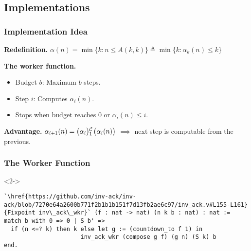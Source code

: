 \subsection{Implementations}
\begin{frame}
\frametitle{Implementation Idea}
\textbf{Redefinition.}
$
\alpha(n) = \min\{k: n\le A(k, k) \} \triangleq \min\{k: \alpha_k(n)\le k \}
$

\bigskip

\textbf{The worker function.}
\bigskip
\begin{itemize}
	\item Budget $b$: Maximum $b$ steps.
	\item Step $i$: Computes $\alpha_i(n)$.
	\item Stops when budget reaches $0$ or $\alpha_i(n) \le i$.
\end{itemize}

\bigskip

\textbf{Advantage.} $\alpha_{i+1}(n) = \cdt{\big(\alpha_i\big)}{1}\big(\alpha_i(n)\big)$ $\implies$ next step is computable from the previous.
\end{frame}


\begin{frame}[fragile]
\frametitle{The Worker Function}


\bigskip

\begin{overlayarea}{\linewidth}{3cm}
\begin{onlyenv}<2->
	\begin{lstlisting}
`\href{https://github.com/inv-ack/inv-ack/blob/7270e64a2600b771f2b1b1b151f7d13fb2ae6c97/inv_ack.v#L155-L161} {Fixpoint inv\_ack\_wkr}` (f : nat -> nat) (n k b : nat) : nat :=
match b with 0 => 0 | S b' =>
  if (n <=? k) then k else let g := (countdown_to f 1) in
                      inv_ack_wkr (compose g f) (g n) (S k) b
end.
\end{lstlisting}
\end{onlyenv}
\end{overlayarea}

\end{frame}



